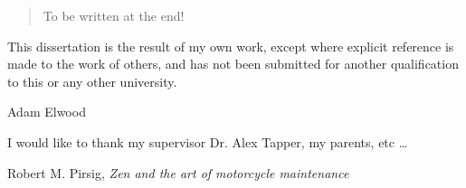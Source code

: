 
\begin{abstract}%
  To be written at the end!
\end{abstract}


\begin{declaration}
  This dissertation is the result of my own work, except where explicit
  reference is made to the work of others, and has not been submitted
  for another qualification to this or any other university.
  \vspace*{1cm}
  \begin{flushright}
    Adam Elwood
  \end{flushright}
\end{declaration}


\begin{acknowledgements}
  I would like to thank my supervisor Dr. Alex Tapper, my parents, etc
  \dots
\end{acknowledgements}


%
%


%
{Robert M. Pirsig, \emph{Zen and the art of motorcycle maintenance}}


